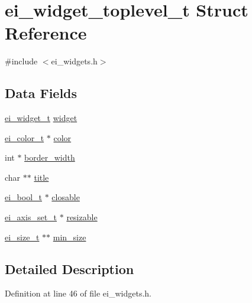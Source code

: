 \hypertarget{structei__widget__toplevel__t}{\section{ei\-\_\-widget\-\_\-toplevel\-\_\-t Struct Reference}
\label{structei__widget__toplevel__t}
}


{\ttfamily \#include $<$ei\-\_\-widgets.\-h$>$}

\subsection*{Data Fields}
\begin{DoxyCompactItemize}
\item 
\hyperlink{structei__widget__t}{ei\-\_\-widget\-\_\-t} \hyperlink{structei__widget__toplevel__t_a3babaea121cf413ae2020cea768479b0}{widget}
\item 
\hyperlink{structei__color__t}{ei\-\_\-color\-\_\-t} $\ast$ \hyperlink{structei__widget__toplevel__t_a5b1efd84c3b1e6598c0fc43ecbf20309}{color}
\item 
int $\ast$ \hyperlink{structei__widget__toplevel__t_a0bbd2bde24c317c088f9e9bce9cc951b}{border\-\_\-width}
\item 
char $\ast$$\ast$ \hyperlink{structei__widget__toplevel__t_af5bec3cdb770dc13da82acef806a8215}{title}
\item 
\hyperlink{ei__types_8h_a383b9af13bd6a0a893096ead3c4d8e28}{ei\-\_\-bool\-\_\-t} $\ast$ \hyperlink{structei__widget__toplevel__t_a809cc88810f816b22028ab993f7b7590}{closable}
\item 
\hyperlink{ei__types_8h_ab5d9ff46ba9b2c9fa6d6fbd2594c6439}{ei\-\_\-axis\-\_\-set\-\_\-t} $\ast$ \hyperlink{structei__widget__toplevel__t_aed16de4bb496bbe2e6695303c10fe659}{resizable}
\item 
\hyperlink{structei__size__t}{ei\-\_\-size\-\_\-t} $\ast$$\ast$ \hyperlink{structei__widget__toplevel__t_a26f1e055e7f494e5609b76d71fc19b3f}{min\-\_\-size}
\end{DoxyCompactItemize}


\subsection{Detailed Description}


Definition at line 46 of file ei\-\_\-widgets.\-h.



